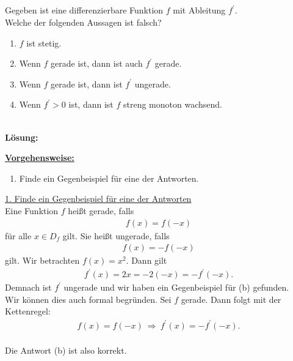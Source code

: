 \newpage

\subsection*{}
Gegeben ist eine differenzierbare Funktion $ f $ mit Ableitung $ f^\prime $.\\
Welche der folgenden Aussagen ist falsch?
\renewcommand{\labelenumi}{(\alph{enumi})}
\begin{enumerate}
	\item 
	$ f  $ ist stetig.
	\item
	Wenn $ f $ gerade ist, dann ist auch $ f^\prime $ gerade.
	\item
	Wenn $ f $ gerade ist, dann ist $ f^\prime $ ungerade.
	\item
	Wenn $ f^\prime > 0 $ ist, dann ist $ f $ streng monoton wachsend.
\end{enumerate}
\ \\
\textbf{Lösung:}
\begin{mdframed}
\underline{\textbf{Vorgehensweise:}}
\renewcommand{\labelenumi}{\theenumi.}
\begin{enumerate}
\item Finde ein Gegenbeispiel für eine der Antworten.
\end{enumerate}
\end{mdframed}

\underline{1. Finde ein Gegenbeispiel für eine der Antworten}\\
Eine Funktion $ f $ heißt gerade, falls
\begin{align*}
f(x) = f(-x)
\end{align*}
für alle $ x \in D_f $ gilt. Sie heißt ungerade, falls
\begin{align*}
f(x) = - f(-x)
\end{align*}
gilt.
Wir betrachten $ f(x) = x^2  $. Dann gilt
\begin{align*}
f^\prime(x) = 2 x = - 2(-x) = -f^\prime(-x).
\end{align*}
Demnach ist $ f^\prime $ ungerade und wir haben ein Gegenbeispiel für (b) gefunden.\\
Wir können dies auch formal begründen. Sei $ f  $ gerade.
Dann folgt mit der Kettenregel:
\begin{align*}
f(x) = f(-x) \ \Rightarrow \ f^\prime(x) = - f^\prime(-x).
\end{align*}
\ \\
Die Antwort (b) ist also korrekt.


\newpage


